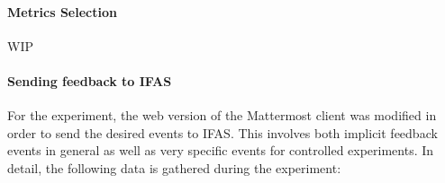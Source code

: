 \paragraph{Metrics Selection}

WIP
\cite{Kelly:2003:IFI:959258.959260}
\cite{Claypool2001} %
\cite{Claypool2001} %



\paragraph{Sending feedback to IFAS}

For the experiment, the web version of the Mattermost client was modified in order to send the desired events to \ac{IFAS}.
This involves both implicit feedback events in general as well as very specific events for controlled experiments.
In detail, the following data is gathered during the experiment:

